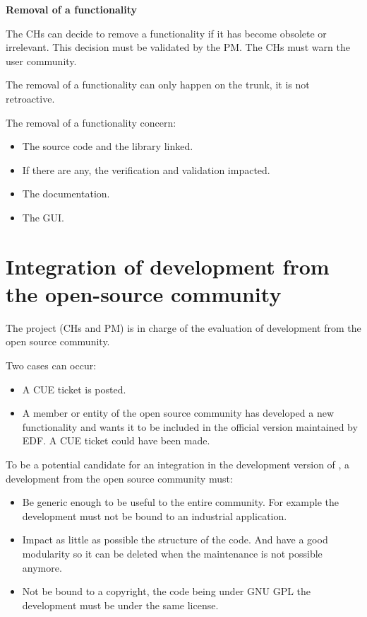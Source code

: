 \textbf{Removal of a functionality}

The CHs can decide to remove a functionality if it has become obsolete or
irrelevant. This decision must be validated by the PM. The CHs must warn the
user community.

The removal of a functionality can only happen on the trunk, it is not
retroactive. 

The removal of a functionality concern:
\begin{itemize}
\item The source code and the library linked.
\item If there are any, the verification and validation impacted.
\item The documentation.
\item The GUI.
\end{itemize}

\section{Integration of development from the open-source community}
\label{devint}

The \telemacsystem project (CHs and PM) is in charge of the evaluation of development
from the open source community.

Two cases can occur:
\begin{itemize}
\item A CUE ticket is posted.
\item A member or entity of the open source community has developed a new
functionality and wants it to be included in the official version maintained by
EDF. A CUE ticket could have been made. 
\end{itemize}

To be a potential candidate for an integration in the development version of
\telemacsystem, a development from the open source community must:
\begin{itemize}
\item Be generic enough to be useful to the entire community. For example the
development must not be bound to an industrial application.
\item Impact as little as possible the structure of the code. And have a good
modularity so it can be deleted when the maintenance is not possible anymore.
\item Not be bound to a copyright, the code being under GNU GPL the development
must be under the same license.
\end{itemize}

